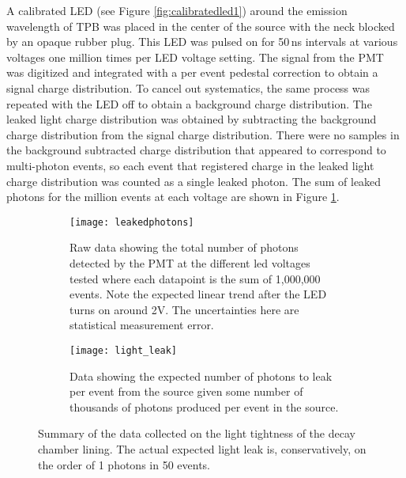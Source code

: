 A calibrated LED (see Figure \ref{fig:calibratedled1}) around the emission wavelength of TPB was placed in the center of the source with the neck blocked by an opaque rubber plug. This LED was pulsed on for 50\,ns intervals at various voltages one million times per LED voltage setting. The signal from the PMT was digitized and integrated with a per event pedestal correction to obtain a signal charge distribution. To cancel out systematics, the same process was repeated with the LED off to obtain a background charge distribution. The leaked light charge distribution was obtained by subtracting the background charge distribution from the signal charge distribution. There were no samples in the background subtracted charge distribution that appeared to correspond to multi-photon events, so each event that registered charge in the leaked light charge distribution was counted as a single leaked photon. The sum of leaked photons for the million events at each voltage are shown in Figure \ref{fig:lightleak}. 
\begin{figure}
        \begin{subfigure}{0.47\textwidth}
                \texttt{[image: leakedphotons]}
                \caption{Raw data showing the total number of photons detected by the PMT at the different led voltages tested where each datapoint is the sum of 1,000,000 events. Note the expected linear trend after the LED turns on around 2V. The uncertainties here are statistical measurement error.}
                \label{fig:lightleak}
        \end{subfigure}%
         \hspace{0.2cm}
        \begin{subfigure}{0.49\textwidth}
                \texttt{[image: light\_leak]}
                \caption{Data showing the expected number of photons to leak per event from the source given some number of thousands of photons produced per event in the source.}
                \label{fig:eventleak}
        \end{subfigure}
        \caption{Summary of the data collected on the light tightness of the decay chamber lining. The actual expected light leak is, conservatively, on the order of 1 photons in 50 events.}
\label{fig:calibratedled2}
\end{figure}

